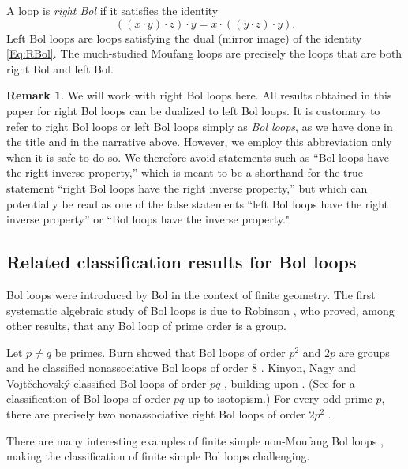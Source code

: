 \documentclass[12pt,reqno]{amsart}
\numberwithin{equation}{section}
\theoremstyle{plain}
\theoremstyle{definition}
\newtheorem*{remark*}{Remark}
\begin{document}
\medskip

A loop is \emph{right Bol} if it satisfies the identity
\begin{equation}\label{Eq:RBol}
	((x\cdot y)\cdot z)\cdot y = x\cdot ((y\cdot z)\cdot y).
\end{equation}
Left Bol loops are loops satisfying the dual (mirror image) of the identity \cref{Eq:RBol}. The much-studied Moufang loops are precisely the loops that are both right Bol and left Bol.

\begin{remark*}
We will work with right Bol loops here. All results obtained in this paper for right Bol loops can be dualized to left Bol loops. It is customary to refer to right Bol loops or left Bol loops simply as \emph{Bol loops}, as we have done in the title and in the narrative above. However, we employ this abbreviation only when it is safe to do so. We therefore avoid statements such as ``Bol loops have the right inverse property,'' which is meant to be a shorthand for the true statement ``right Bol loops have the right inverse property,'' but which can potentially be read as one of the false statements ``left Bol loops have the right inverse property'' or ``Bol loops have the inverse property."
\end{remark*}

\subsection{Related classification results for Bol loops}

Bol loops were introduced by Bol \cite{Bol} in the context of finite geometry. The first systematic algebraic study of Bol loops is due to Robinson \cite{Robinson_thesis,Robinson}, who proved, among other results, that any Bol loop of prime order is a group.

Let $p\ne q$ be primes. Burn showed that Bol loops of order $p^2$ and $2p$ are groups and he classified nonassociative Bol loops of order $8$ \cite{BurnI}. Kinyon, Nagy and Vojt\v{e}chovsk\'y classified Bol loops of order $pq$ \cite{KNVpq}, building upon \cite{NiederreiterRobinson_pq}. (See \cite{Vojtechovsky} for a classification of Bol loops of order $pq$ up to isotopism.) For every odd prime $p$, there are precisely two nonassociative right Bol loops of order $2p^2$ \cite{BurnIII,SharmaSolarin_2p2}.

There are many interesting examples of finite simple non-Moufang Bol loops \cite{BaumeisterStein,Nagy_simple,Nagy_simple2}, making the classification of finite simple Bol loops challenging.
\end{document}
